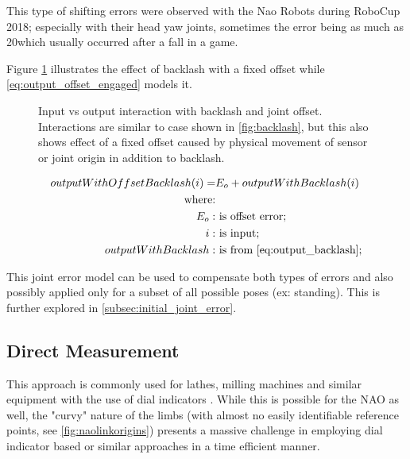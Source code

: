 \documentclass[english, printversion, nomenclature, notitle]{tuvisionthesis} %
\begin{document}
This type of shifting errors were observed with the Nao Robots during RoboCup 2018; especially with their head yaw joints, sometimes the error being as much as 20\degree which usually occurred after a fall in a game.

Figure \ref{fig:backlash_offset} illustrates the effect of backlash with a fixed offset while \cref{eq:output_offset_engaged} models it.

\begin{figure}
	\def\svgwidth{\linewidth}
	
	\caption[Input vs output interaction with backlash and joint offsets.]{Input vs output interaction with backlash and joint offset. Interactions are similar to case shown in \ref{fig:backlash}, but this also shows effect of a fixed offset caused by physical movement of sensor or joint origin in addition to backlash.}
	\label{fig:backlash_offset}
\end{figure}

\begin{equation}
\begin{aligned}
outputWithOffsetBacklash(i) =& E_o + outputWithBacklash(i)\\
\text{where:}&\\
E_o : & \text{ is offset error};\\
i : & \text{ is input};\\
outputWithBacklash :& \text{ is from \cref{eq:output_backlash}};\\
\end{aligned}
\label{eq:output_offset_engaged}
\end{equation}

This joint error model can be used to compensate both types of errors and also possibly applied only for a subset of all possible poses (ex: standing). This is further explored in \cref{subsec:initial_joint_error}.

\subsection{Direct Measurement}

This approach is commonly used for lathes, milling machines and similar equipment with the use of dial indicators \cite{SCHWENKE2008660}. While this is possible for the NAO as well, the "curvy" nature of the limbs (with almost no easily identifiable reference points, see \cref{fig:naolinkorigins}) presents a massive challenge in employing dial indicator based or similar approaches in a time efficient manner.
\end{document}
